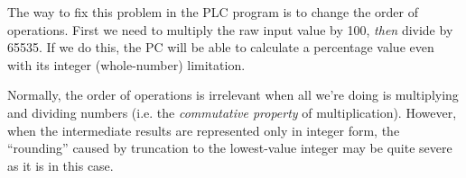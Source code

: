 \vskip 10pt

The way to fix this problem in the PLC program is to change the order of operations.  First we need to multiply the raw input value by 100, {\it then} divide by 65535.  If we do this, the PC will be able to calculate a percentage value even with its integer (whole-number) limitation. 

Normally, the order of operations is irrelevant when all we're doing is multiplying and dividing numbers (i.e. the {\it commutative property} of multiplication).  However, when the intermediate results are represented only in integer form, the ``rounding'' caused by truncation to the lowest-value integer may be quite severe as it is in this case.




